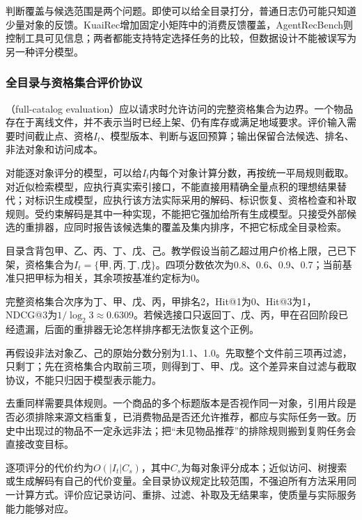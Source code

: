 判断覆盖与候选范围是两个问题。即使可以给全目录打分，普通日志仍可能只知道少量对象的反馈。KuaiRec增加固定小矩阵中的消费反馈覆盖，AgentRecBench则控制工具可见信息；两者都能支持特定选择任务的比较，但数据设计不能被误写为另一种评分模型。

\subsubsection{全目录与资格集合评价协议}
\label{sec:rs-evaluation-full-catalog}

（full-catalog evaluation）应以请求时允许访问的完整资格集合为边界。一个物品存在于离线文件，并不表示当时已经上架、仍有库存或满足地域要求。评价输入需要时间截止点、资格$I_t$、模型版本、判断与返回预算；输出保留合法候选、排名、非法对象和访问成本。

对能逐对象评分的模型，可以给$I_t$内每个对象计算分数，再按统一平局规则截取。对近似检索模型，应执行真实索引接口，不能直接用精确全量点积的理想结果替代；对标识生成模型，应执行该方法实际采用的解码、标识恢复、资格检查和补取规则。受约束解码是其中一种实现，不能把它强加给所有生成模型。只接受外部候选的重排器，应同时报告该候选集的覆盖及集内排序，不把它标成全目录检索。

\begin{example}[过滤、召回与排序分开计数]
目录含背包甲、乙、丙、丁、戊、己。教学假设当前乙超过用户价格上限，己已下架，资格集合为$I_t=\{\text{甲},\text{丙},\text{丁},\text{戊}\}$。四项分数依次为0.8、0.6、0.9、0.7；当前基准只把甲标为相关，其余项按基准约定标为0。

完整资格集合次序为丁、甲、戊、丙，甲排名2，Hit@1为0、Hit@3为1，NDCG@3为$1/\log_2 3\approx0.6309$。若候选接口只返回丁、戊、丙，甲在召回阶段已经遗漏，后面的重排器无论怎样排序都无法恢复这个正例。

再假设非法对象乙、己的原始分数分别为1.1、1.0。先取整个文件前三项再过滤，只剩丁；先在资格集合内取前三项，则得到丁、甲、戊。这个差异来自过滤与截取协议，不能只归因于模型表示能力。
\end{example}

去重同样需要具体规则。一个商品的多个标题版本是否视作同一对象，引用片段是否必须排除来源文档重复，已消费物品是否还允许推荐，都应与实际任务一致。历史中出现过的物品不一定永远非法；把“未见物品推荐”的排除规则搬到复购任务会直接改变目标。

逐项评分的代价约为$O(|I_t|C_s)$，其中$C_s$为每对象评分成本；近似访问、树搜索或生成解码有自己的代价变量。全目录协议规定比较范围，不强迫所有方法采用同一计算方式。评价应记录访问、重排、过滤、补取及无结果率，使质量与实际服务能力能够对应。

